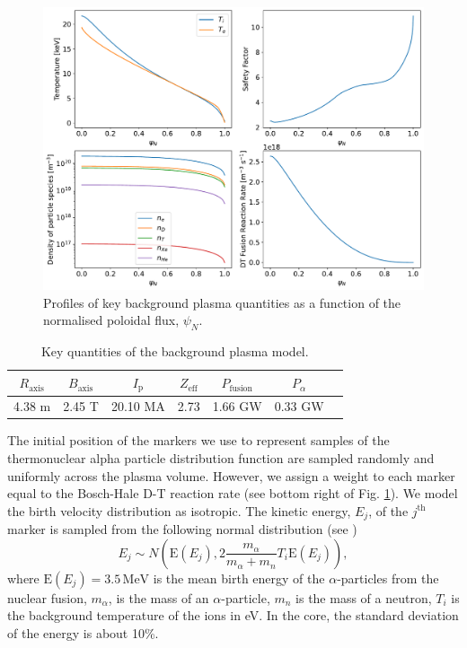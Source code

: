 \documentclass[10pt, a4paper, twoside]{article}
\begin{document}
\begin{figure}[!ht]
    \centering
    \includegraphics[width=0.99\linewidth]{Figures/background_plasma_curves.pdf}
    \caption{Profiles of key background plasma quantities as a function of the normalised poloidal flux, $\psi_N$.}
    \label{fig:background_plasma_profiles}
\end{figure}

\begin{table}[htbp]
\centering
\begin{tabular}{ccccccc}
\hline
$R_{\text{axis}}$ & $B_{\text{axis}}$ & $I_{\text{p}}$ & $Z_{\text{eff}}$ & $P_{\text{fusion}}$ & $P_{\alpha}$ \\
\hline
4.38 m & 2.45 T & 20.10 MA & 2.73 & 1.66 GW & 0.33 GW \\
\hline
\end{tabular}
\caption{Key quantities of the background plasma model.}
\label{table:fusion_params}
\end{table}

The initial position of the markers we use to represent samples of the thermonuclear alpha particle distribution function are sampled randomly and uniformly across the plasma volume. However, we assign a weight to each marker equal to the Bosch-Hale D-T reaction rate (see bottom right of Fig. \ref{fig:background_plasma_profiles}). We model the birth velocity distribution as isotropic. The kinetic energy, $E_j$, of the $j^{\text{th}}$ marker is sampled from the following normal distribution (see \cite{brysk1973})
\begin{equation}
    E_j \sim N\left(\text{E}(E_j), 2\frac{m_\alpha}{m_\alpha + m_n} T_i\text{E}(E_j) \right),
\end{equation}
where $\text{E}(E_j)=3.5\,\text{MeV}$ is the mean birth energy of the $\alpha$-particles from the nuclear fusion, $m_\alpha$, is the mass of an $\alpha$-particle, $m_n$ is the mass of a neutron, $T_i$ is the background temperature of the ions in eV. In the core, the standard deviation of the energy is about 10\%.
\end{document}
